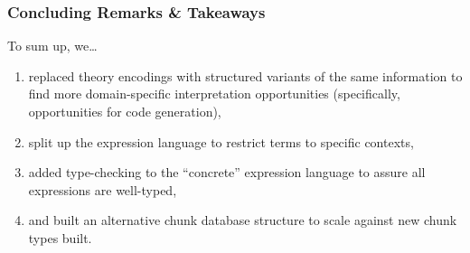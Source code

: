 \documentclass[xcolor={dvipsnames}]{beamer}
\begin{document}
\begin{frame}
  \frametitle{Concluding Remarks \& Takeaways}

  To sum up, we\ldots{}
  \begin{enumerate}
    \item replaced theory encodings with structured variants of the same
          information to find more domain-specific interpretation opportunities
          (specifically, opportunities for code generation),
    \item split up the expression language to restrict terms to specific contexts,
    \item added type-checking to the ``concrete'' expression language to assure
          all expressions are well-typed,
    \item and built an alternative chunk database structure to scale against new
          chunk types built.
  \end{enumerate}
\end{frame}
\end{document}
